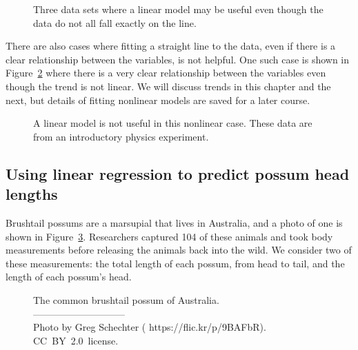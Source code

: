 \begin{figure}
   \centering
   \caption{Three data sets where a linear model may be useful
       even though the data do not all fall exactly on the line.}
   \label{imperfLinearModel}
\end{figure}

There are also cases where fitting a straight line to the data,
even if there is a clear relationship between the variables,
is not helpful.
One such case is shown in
Figure~\ref{notGoodAtAllForALinearModel}
where there is a very clear relationship between the variables
even though the trend is not linear.
We will discuss  trends in this chapter
and the next, but details of fitting nonlinear models
are saved for a later course.

\begin{figure}
   \centering
   \caption{A linear model is not useful in this nonlinear case.
       These data are from an introductory physics experiment.}
   \label{notGoodAtAllForALinearModel}
\end{figure}




\subsection{Using linear regression to predict possum head lengths}


Brushtail possums are a marsupial that lives in Australia,
and a photo of one is shown in
Figure~\ref{brushtail_possum}.
Researchers captured 104 of these animals and took body
measurements before releasing the animals back into the wild.
We consider two of these measurements:
the total length of each possum, from head to tail,
and the length of each possum's head.

\setlength{\captionwidth}{0.83\mycaptionwidth}
\begin{figure}[h]
  \centering
  \caption{The common brushtail possum of Australia.\vspace{-1mm} \\
      -----------------------------\vspace{-2mm}\\
      {\footnotesize Photo by Greg Schechter
      (
          {https://flic.kr/p/9BAFbR}).
          {CC~BY~2.0~license}.}}
  \label{brushtail_possum}
\end{figure}
\setlength{\captionwidth}{\mycaptionwidth}

